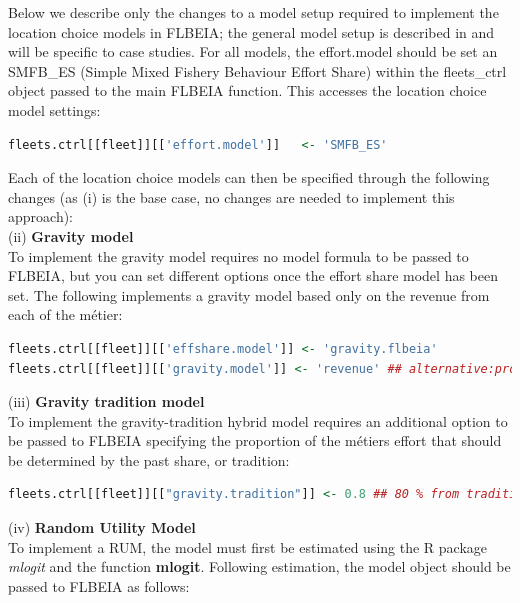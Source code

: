 \documentclass[12pt, halfline, a4paper]{ouparticle}
\begin{document}
Below we describe only the changes to a model setup required to implement the
location choice models in FLBEIA; the general model setup is described in
\cite{Garcia2017a} and will be specific to case studies. For all models, the
effort.model should be set an SMFB\_ES (Simple Mixed Fishery Behaviour Effort
Share) within the fleets\_ctrl object passed to the main FLBEIA function. This
accesses the location choice model settings:

\begin{lstlisting}[language=R]
fleets.ctrl[[fleet]][['effort.model']]   <- 'SMFB_ES'
\end{lstlisting} 

Each of the location choice models can then be specified through the following
changes (as (i) is the base case, no changes are needed to implement this
approach): \\

(ii) \textbf{Gravity model} \\

To implement the gravity model requires no model formula to be passed to
FLBEIA, but you can set different options once the effort share model has been
set. The following implements a gravity model based only on the revenue from
each of the métier:

\begin{lstlisting}[language=R]
fleets.ctrl[[fleet]][['effshare.model']] <- 'gravity.flbeia'
fleets.ctrl[[fleet]][['gravity.model']] <- 'revenue' ## alternative:profit 
\end{lstlisting}

(iii) \textbf{Gravity tradition model} \\

To implement the gravity-tradition hybrid model requires an additional option
to be passed to FLBEIA specifying the proportion of the métiers effort that
should be determined by the past share, or tradition:

\begin{lstlisting}[language=R]
fleets.ctrl[[fleet]][["gravity.tradition"]] <- 0.8 ## 80 % from tradition
\end{lstlisting}

(iv) \textbf{Random Utility Model} \\

To implement a RUM, the model must first be estimated using the R package
\textit{mlogit} \citep{Croissant2019} and the function \textbf{mlogit}.
Following estimation, the model object should be passed to FLBEIA as follows:
\end{document}
